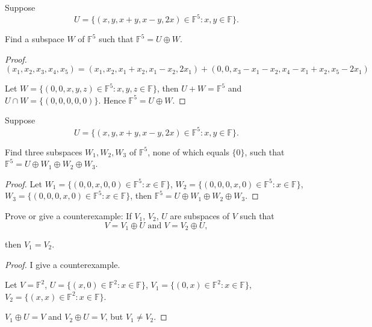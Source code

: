 \begin{exercise}
    Suppose
    \[
        U = \{ (x, y, x+y, x-y, 2x)\in\mathbb{F}^{5}: x, y\in\mathbb{F} \}.
    \]

    Find a subspace $W$ of $\mathbb{F}^{5}$ such that $\mathbb{F}^{5} = U\oplus W$.
\end{exercise}

\begin{proof}
    \[
        (x_{1}, x_{2}, x_{3}, x_{4}, x_{5}) = (x_{1}, x_{2}, x_{1} + x_{2}, x_{1} - x_{2}, 2x_{1}) + (0, 0, x_{3} - x_{1} - x_{2}, x_{4} - x_{1} + x_{2}, x_{5} - 2x_{1})
    \]

    Let $W = \{ (0, 0, x, y, z)\in\mathbb{F}^{5}: x, y, z\in\mathbb{F} \}$, then $U + W = \mathbb{F}^{5}$ and $U\cap W = \{ (0, 0, 0, 0, 0) \}$. Hence $\mathbb{F}^{5} = U\oplus W$.
\end{proof}

\begin{exercise}
    Suppose
    \[
        U = \{ (x, y, x+y, x-y, 2x)\in\mathbb{F}^{5}: x, y\in\mathbb{F} \}.
    \]

    Find three subspaces $W_{1}, W_{2}, W_{3}$ of $\mathbb{F}^{5}$, none of which equals $\{0\}$, such that $\mathbb{F}^{5} = U\oplus W_{1}\oplus W_{2}\oplus W_{3}$.
\end{exercise}

\begin{proof}
    Let $W_{1} = \{ (0, 0, x, 0, 0)\in\mathbb{F}^{5}: x\in\mathbb{F} \}$, $W_{2} = \{ (0, 0, 0, x, 0)\in\mathbb{F}^{5}: x\in\mathbb{F} \}$, $W_{3} = \{ (0, 0, 0, x, 0)\in\mathbb{F}^{5}: x\in\mathbb{F} \}$, then $\mathbb{F}^{5} = U\oplus W_{1}\oplus W_{2}\oplus W_{3}$.
\end{proof}

\begin{exercise}
    Prove or give a counterexample: If $V_{1}$, $V_{2}$, $U$ are subspaces of $V$ such that
    \[
        V = V_{1}\oplus U\text{ and } V = V_{2}\oplus U,
    \]

    then $V_{1} = V_{2}$.
\end{exercise}

\begin{proof}
    I give a counterexample.

    Let $V = \mathbb{F}^{2}$, $U = \{ (x, 0)\in \mathbb{F}^{2}: x\in\mathbb{F} \}$, $V_{1} = \{ (0, x)\in \mathbb{F}^{2}: x\in\mathbb{F} \}$, $V_{2} = \{ (x, x)\in \mathbb{F}^{2}: x\in\mathbb{F} \}$.

    $V_{1} \oplus U = V$ and $V_{2} \oplus U = V$, but $V_{1}\ne V_{2}$.
\end{proof}

